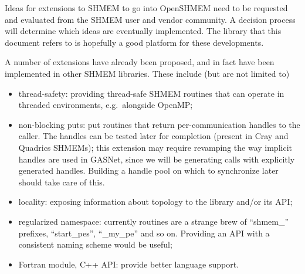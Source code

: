 \documentclass[english]{article}
\begin{document}
Ideas for extensions to SHMEM to go into OpenSHMEM need to be
requested and evaluated from the SHMEM user and vendor community. A
decision process will determine which ideas are eventually
implemented. The library that this document refers to is hopefully a
good platform for these developments.

A number of extensions have already been proposed, and in fact have
been implemented in other SHMEM libraries. These include (but are not
limited to)

\begin{itemize}
\item thread-safety: providing thread-safe SHMEM routines that can
operate in threaded environments, e.g.\ alongside OpenMP;
\item non-blocking puts: put routines that return per-communication
handles to the caller. The handles can be tested later for completion
(present in Cray and Quadrics SHMEMs); this extension may require
revamping the way implicit handles are used in GASNet, since we will
be generating calls with explicitly generated handles. Building a
handle pool on which to synchronize later should take care of this.
\item locality: exposing information about topology to the library
and/or its API;
\item regularized namespace: currently routines are a strange brew of
``shmem\_'' prefixes, ``start\_pes'', ``\_my\_pe'' and so
on. Providing an API with a consistent naming scheme would be useful;
\item Fortran module, C++ API: provide better language support.
\end{itemize}
\end{document}
